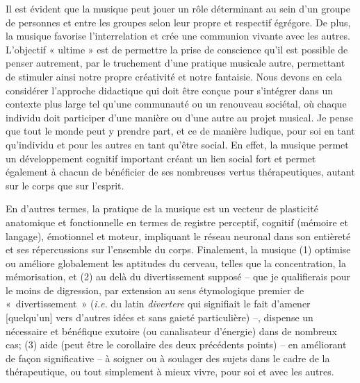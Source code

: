 \bigskip
Il est évident que la musique peut jouer un rôle déterminant au sein d'un groupe de personnes et entre les groupes selon leur propre et respectif égrégore. De plus, la musique favorise l'interrelation et crée une communion vivante avec les autres. L'objectif « ultime » est de permettre la prise de conscience qu'il est possible de penser autrement, par le truchement d'une pratique musicale autre, permettant de stimuler ainsi notre propre créativité et notre fantaisie. Nous devons en cela considérer l'approche didactique qui doit être conçue pour s'intégrer dans un contexte plus large tel qu'une communauté ou un renouveau  sociétal, où chaque individu doit participer d'une manière ou d'une autre au projet musical. Je pense que tout le monde peut y prendre part, et ce de manière ludique, pour soi en tant qu'individu et pour les autres en tant qu'être social. En effet, la musique permet un développement cognitif important créant un lien social fort et permet également à chacun de bénéficier de ses nombreuses vertus thérapeutiques, autant sur le corps que sur l'esprit. 

En d'autres termes, la pratique de la musique est un vecteur de plasticité anatomique et fonctionnelle en termes de registre perceptif, cognitif (mémoire et langage), émotionnel et moteur, impliquant le réseau neuronal dans son entièreté et ses répercussions sur l'ensemble du corps. Finalement, la musique (1) optimise ou améliore globalement les aptitudes du cerveau, telles que la concentration, la mémorisation, et (2) au delà du divertissement supposé -- que je qualifierais pour le moins de digression, par extension au sens étymologique premier de \hbox{« divertissement »} (\textit{i.e.} du latin \textit{divertere} qui signifiait le fait d'amener [quelqu'un] vers d'autres idées et sans gaieté particulière) --, dispense un nécessaire et bénéfique exutoire (ou canalisateur d'énergie) dans de nombreux cas; (3) aide (peut être le corollaire des deux précédents points) -- en améliorant de façon significative -- à soigner ou à soulager des sujets dans le cadre de la thérapeutique, ou tout simplement à mieux vivre, pour soi et avec les autres.

\bigskip

